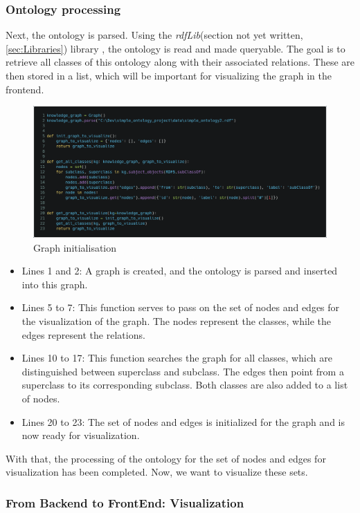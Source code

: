 \subsubsection{Ontology processing}
Next, the ontology is parsed. Using the \textit{rdfLib}(section not yet written, 
\ref{sec:Libraries}) library , the ontology is read and made queryable. The goal is to retrieve all classes of this ontology along with their associated relations. 
These are then stored in a list, which will be important for visualizing the graph in the frontend.
\begin{figure}[H]
    \includegraphics[scale=0.2]{Graphics/simple_ontology_graph_init.png}
    \caption{Graph initialisation}
    \end{figure}
    
\begin{itemize}
    \item Lines 1 and 2: A graph is created, and the ontology is parsed and inserted into this graph.
    \item Lines 5 to 7: This function serves to pass on the set of nodes and edges for the visualization of the graph. The nodes represent the classes, while the edges represent the relations.
    \item Lines 10 to 17: This function searches the graph for all classes, which are distinguished between superclass and subclass. The edges then point from a superclass to its corresponding subclass. Both classes are also added to a list of nodes.
    \item Lines 20 to 23: The set of nodes and edges is initialized for the graph and is now ready for visualization.
\end{itemize}

With that, the processing of the ontology for the set of nodes and edges for visualization has been completed. Now, we want to visualize these sets.

\subsubsection{From Backend to FrontEnd: Visualization}

